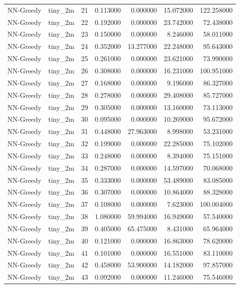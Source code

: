 \begin{tabular}{llrrrrr}
NN-Greedy & tiny_2m & 21 & 0.113000 & 0.000000 & 15.072000 & 122.258000 \\
NN-Greedy & tiny_2m & 22 & 0.192000 & 0.000000 & 23.742000 & 72.438000 \\
NN-Greedy & tiny_2m & 23 & 0.150000 & 0.000000 & 8.246000 & 58.011000 \\
NN-Greedy & tiny_2m & 24 & 0.352000 & 13.277000 & 22.248000 & 95.643000 \\
NN-Greedy & tiny_2m & 25 & 0.261000 & 0.000000 & 23.621000 & 73.990000 \\
NN-Greedy & tiny_2m & 26 & 0.308000 & 0.000000 & 16.231000 & 100.951000 \\
NN-Greedy & tiny_2m & 27 & 0.168000 & 0.000000 & 9.196000 & 86.327000 \\
NN-Greedy & tiny_2m & 28 & 0.278000 & 0.000000 & 29.408000 & 85.727000 \\
NN-Greedy & tiny_2m & 29 & 0.305000 & 0.000000 & 13.160000 & 73.113000 \\
NN-Greedy & tiny_2m & 30 & 0.095000 & 0.000000 & 10.269000 & 95.672000 \\
NN-Greedy & tiny_2m & 31 & 0.448000 & 27.963000 & 8.998000 & 53.231000 \\
NN-Greedy & tiny_2m & 32 & 0.199000 & 0.000000 & 22.285000 & 75.102000 \\
NN-Greedy & tiny_2m & 33 & 0.248000 & 0.000000 & 8.394000 & 75.151000 \\
NN-Greedy & tiny_2m & 34 & 0.287000 & 0.000000 & 14.597000 & 70.068000 \\
NN-Greedy & tiny_2m & 35 & 0.333000 & 0.000000 & 53.489000 & 83.085000 \\
NN-Greedy & tiny_2m & 36 & 0.307000 & 0.000000 & 10.864000 & 88.328000 \\
NN-Greedy & tiny_2m & 37 & 0.108000 & 0.000000 & 7.623000 & 100.004000 \\
NN-Greedy & tiny_2m & 38 & 1.080000 & 59.994000 & 16.949000 & 57.540000 \\
NN-Greedy & tiny_2m & 39 & 0.405000 & 65.475000 & 8.431000 & 65.964000 \\
NN-Greedy & tiny_2m & 40 & 0.121000 & 0.000000 & 16.863000 & 78.620000 \\
NN-Greedy & tiny_2m & 41 & 0.101000 & 0.000000 & 16.551000 & 83.110000 \\
NN-Greedy & tiny_2m & 42 & 0.458000 & 53.900000 & 14.182000 & 97.857000 \\
NN-Greedy & tiny_2m & 43 & 0.092000 & 0.000000 & 11.246000 & 75.546000 \\

\end{tabular}
